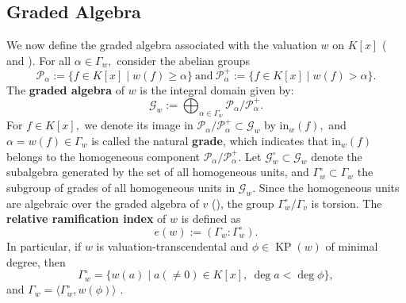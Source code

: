 \documentclass[11pt]{amsart}
\theoremstyle{definition}
\theoremstyle{remark}
\numberwithin{equation}{section}
\begin{document}
\subsection{Graded Algebra}
	
	We now define the graded algebra associated with the valuation $w$ on $K[x]$ (\cite{EN4} and \cite{EN3}). For all $\alpha\in \Gamma_w,$ consider the abelian groups
\[\mathcal{P}_\alpha:=\{f\in K[x]\mid w(f)\geq \alpha\}\  \text{and} \ \mathcal{P}_\alpha^+:=\{f\in K[x]\mid w(f)> \alpha\}.\]
The \textbf{graded algebra} of $w$ is the integral domain given by:
\[\mathcal{G}_w:= \bigoplus_{\alpha \in \Gamma_w} \mathcal{P}_\alpha  / \mathcal{P}_\alpha^+ .\]
For $f\in K[x],$ we denote its image in $\mathcal{P}_\alpha  / \mathcal{P}_\alpha^+ \subset \mathcal{G}_w $ by $\text{in}_w(f),$ and $\alpha=w(f)\in\Gamma_w$ is called the natural \textbf{grade}, which indicates that $\text{in}_w(f)$ belongs to the homogeneous component $\mathcal{P}_\alpha  / \mathcal{P}_\alpha^+ $.
Let $\mathcal{G}_w^\circ \subset \mathcal{G}_w$ denote the subalgebra generated by the set of all homogeneous units, and $\Gamma_{w} ^{\circ}\subset  \Gamma_{w} $ the subgroup of grades of all homogeneous units in $\mathcal{G}_w.$ Since the homogeneous units are algebraic over the graded algebra of $v$ (\cite[Proposition 3.5]{EN4}), the group $\Gamma_{w} ^{\circ}/\Gamma_v$ is torsion. The {\bf relative ramification index} of $w$ is defined as 
\[e(w):=( \Gamma_{w}:\Gamma_{w} ^{\circ}).\]
 In particular, if $w$ is valuation-transcendental and $\phi\in\operatorname{KP}(w)$ of minimal degree, then
\[\Gamma_{w} ^{\circ}=\{w(a)\mid a(\neq 0)\in K[x],~\deg a<\deg\phi\},\]
and $\Gamma_w=\langle\Gamma_{w} ^{\circ}, w(\phi)\rangle$ \cite[Lemma 2.11]{EN4}.

\end{document}
